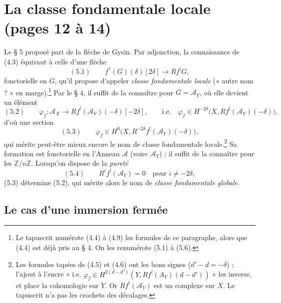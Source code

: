 \documentclass[11pt,a4paper]{article}
\begin{document}
\section*{La classe fondamentale locale (pages 12 à 14)}

Le § 5 proposé part de la flèche de Gysin. Par adjonction, la connaissance de
(4.3) équivaut à celle d'une flèche
\[
(5.1)\qquad f^*(G)(\delta)[2\delta] \longrightarrow Rf^!G,
\]
fonctorielle en $G$, qu'il propose d'appeler \emph{classe fondamentale
locale} (« autre nom ? » en marge).\footnote{Le tapuscrit numérote (4.4) à
(4.9) les formules de ce paragraphe, alors que (4.4) est déjà pris au
§ 4. On les renumérote (5.1) à (5.6).} Par le § 4, il suffit de la connaître
pour $G = \mathcal{A}_Y$, où elle devient un élément
\[
(5.2)\qquad \varphi_f\colon \mathcal{A}_X \to Rf^!(\mathcal{A}_Y)(-\delta)[-2\delta],
\qquad\text{i.e.}\quad \varphi_f \in H^{-2\delta}\bigl(X, Rf^!(\mathcal{A}_Y)(-\delta)\bigr),
\]
d'où une section
\[
(5.3)\qquad \varphi_f \in H^0\bigl(X, R^{-2\delta}f^!(\mathcal{A}_Y)(-\delta)\bigr),
\]
qui mérite peut-être mieux encore le nom de classe fondamentale
locale.\footnote{Les formules tapées de (4.5) et (4.6) ont les bons signes
($d'-d = -\delta$) ; l'ajout à l'encre « i.e. $\varphi_f \in
H^{2(d-d')}(Y, Rf^!(A_Y)(d-d'))$ » les inverse, et place la cohomologie sur
$Y$. Or $Rf^!(\mathcal{A}_Y)$ est un complexe sur $X$. Le tapuscrit n'a pas les
crochets des décalages.} Sa formation est fonctorielle en l'Anneau $\mathcal{A}$
(voire $\mathcal{A}_Y$) ; il suffit de la connaître pour les
$\mathbb{Z}/n\mathbb{Z}$. Lorsqu'on dispose de la \emph{pureté}
\[
(5.4)\qquad R^if^!(\mathcal{A}_Y) = 0 \quad\text{pour } i \neq -2\delta,
\]
(5.3) détermine (5.2), qui mérite alors le nom de \emph{classe fondamentale
globale}.

\subsection*{Le cas d'une immersion fermée}
\end{document}
